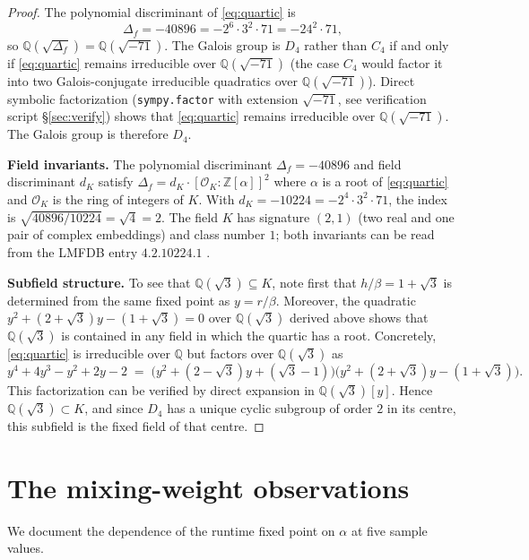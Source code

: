 \documentclass[11pt,reqno]{amsart}
\theoremstyle{plain}
\theoremstyle{definition}
\theoremstyle{remark}
\newcommand{\Z}{\mathbb{Z}}
\newcommand{\Q}{\mathbb{Q}}
\begin{document}
\begin{proof}
The polynomial discriminant of \eqref{eq:quartic} is
\[
\Delta_{f}=-40896=-2^{6}\cdot 3^{2}\cdot 71=-24^{2}\cdot 71,
\]
so $\Q(\sqrt{\Delta_{f}})=\Q(\sqrt{-71})$. The Galois group is
$D_{4}$ rather than $C_{4}$ if and only if \eqref{eq:quartic}
remains irreducible over $\Q(\sqrt{-71})$ (the case $C_{4}$ would
factor it into two Galois-conjugate irreducible quadratics over
$\Q(\sqrt{-71})$). Direct symbolic factorization
(\texttt{sympy.factor} with extension $\sqrt{-71}$, see
verification script \S\ref{sec:verify}) shows that
\eqref{eq:quartic} remains irreducible over $\Q(\sqrt{-71})$. The
Galois group is therefore $D_{4}$.

\textbf{Field invariants.} The polynomial discriminant
$\Delta_{f}=-40896$ and field discriminant $d_{K}$ satisfy
$\Delta_{f}=d_{K}\cdot[\mathcal{O}_{K}:\Z[\alpha]]^{2}$ where
$\alpha$ is a root of \eqref{eq:quartic} and $\mathcal{O}_{K}$ is
the ring of integers of $K$. With
$d_{K}=-10224=-2^{4}\cdot 3^{2}\cdot 71$, the index is
$\sqrt{40896/10224}=\sqrt{4}=2$. The field $K$ has signature
$(2,1)$ (two real and one pair of complex embeddings) and class
number $1$; both invariants can be read from the LMFDB entry
\textnumero $4.2.10224.1$ \cite{LMFDB2024}.

\textbf{Subfield structure.} To see that
$\Q(\sqrt{3})\subseteq K$, note first that $h/\beta=1+\sqrt{3}$ is
determined from the same fixed point as $y=r/\beta$. Moreover, the
quadratic $y^{2}+(2+\sqrt{3})y-(1+\sqrt{3})=0$ over
$\Q(\sqrt{3})$ derived above shows that $\Q(\sqrt{3})$ is
contained in any field in which the quartic has a root.
Concretely, \eqref{eq:quartic} is irreducible over $\Q$ but
factors over $\Q(\sqrt{3})$ as
\[
y^{4}+4y^{3}-y^{2}+2y-2\;=\;\bigl(y^{2}+(2-\sqrt{3})y+(\sqrt{3}-1)\bigr)\bigl(y^{2}+(2+\sqrt{3})y-(1+\sqrt{3})\bigr).
\]
This factorization can be verified by direct expansion in
$\Q(\sqrt{3})[y]$. Hence $\Q(\sqrt{3})\subset K$, and since
$D_{4}$ has a unique cyclic subgroup of order $2$ in its centre,
this subfield is the fixed field of that centre.
\end{proof}

\section{The mixing-weight observations}\label{sec:alpha}

We document the dependence of the runtime fixed point on $\alpha$
at five sample values.
\end{document}

